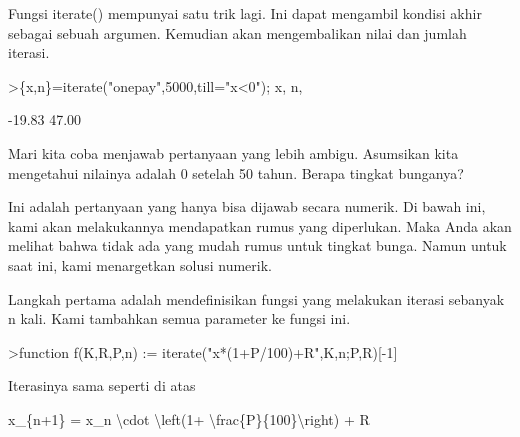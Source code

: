\documentclass[a4paper,10pt]{article}
\begin{document}
\begin{eulernotebook}
\begin{eulercomment}
\begin{eulercomment}
\begin{eulercomment}
\begin{eulercomment}
\begin{eulercomment}
\begin{eulercomment}
\begin{eulercomment}
\begin{eulercomment}
\begin{eulercomment}
\begin{eulercomment}
\begin{eulercomment}
\begin{eulercomment}
\begin{eulercomment}
\begin{eulercomment}
\begin{eulercomment}
\begin{eulercomment}
\begin{eulercomment}
\begin{eulercomment}
\begin{eulercomment}
\begin{eulercomment}
\begin{eulercomment}
\begin{eulercomment}
\begin{eulercomment}
\begin{eulercomment}
\begin{eulercomment}
\begin{eulercomment}
\begin{eulercomment}
\begin{eulercomment}
\begin{eulercomment}
\begin{eulercomment}
\begin{eulercomment}
\begin{eulercomment}
\begin{eulercomment}
\begin{eulercomment}
\begin{eulercomment}
Fungsi iterate() mempunyai satu trik lagi. Ini dapat mengambil kondisi
akhir sebagai sebuah argumen. Kemudian akan mengembalikan nilai dan
jumlah iterasi.
\end{eulercomment}
\begin{eulerprompt}
>\{x,n\}=iterate("onepay",5000,till="x<0"); x, n,
\end{eulerprompt}
\begin{euleroutput}
       -19.83 
        47.00 
\end{euleroutput}
\begin{eulercomment}
Mari kita coba menjawab pertanyaan yang lebih ambigu. Asumsikan kita
mengetahui nilainya adalah 0 setelah 50 tahun. Berapa tingkat
bunganya?

Ini adalah pertanyaan yang hanya bisa dijawab secara numerik. Di bawah
ini, kami akan melakukannya mendapatkan rumus yang diperlukan. Maka
Anda akan melihat bahwa tidak ada yang mudah rumus untuk tingkat
bunga. Namun untuk saat ini, kami menargetkan solusi numerik.

Langkah pertama adalah mendefinisikan fungsi yang melakukan iterasi
sebanyak n kali. Kami tambahkan semua parameter ke fungsi ini.
\end{eulercomment}
\begin{eulerprompt}
>function f(K,R,P,n) := iterate("x*(1+P/100)+R",K,n;P,R)[-1]
\end{eulerprompt}
\begin{eulercomment}
Iterasinya sama seperti di atas

x\_\{n+1\} = x\_n \textbackslash{}cdot \textbackslash{}left(1+ \textbackslash{}frac\{P\}\{100\}\textbackslash{}right) + R


\end{eulercomment}
\end{eulercomment}
\end{eulercomment}
\end{eulercomment}
\end{eulercomment}
\end{eulercomment}
\end{eulercomment}
\end{eulercomment}
\end{eulercomment}
\end{eulercomment}
\end{eulercomment}
\end{eulercomment}
\end{eulercomment}
\end{eulercomment}
\end{eulercomment}
\end{eulercomment}
\end{eulercomment}
\end{eulercomment}
\end{eulercomment}
\end{eulercomment}
\end{eulercomment}
\end{eulercomment}
\end{eulercomment}
\end{eulercomment}
\end{eulercomment}
\end{eulercomment}
\end{eulercomment}
\end{eulercomment}
\end{eulercomment}
\end{eulercomment}
\end{eulercomment}
\end{eulercomment}
\end{eulercomment}
\end{eulercomment}
\end{eulercomment}
\end{eulernotebook}
\end{document}
